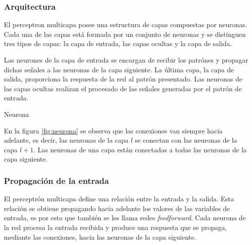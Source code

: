 \subsubsection{Arquitectura}
El perceptron multicapa posee una estructura de capas compuestas por neuronas. Cada una de las capas está formada por un conjunto de neuronas y se distinguen tres tipos de capas: la capa de entrada, las capas ocultas y la capa de salida.

Las neurones de la capa de entrada se encargan de recibir los patrónes y propagar dichas señales a las neuronas de la capa siguiente. La última capa, la capa de salida, proporciona la respuesta de la red al patrón presentado. Las neuronas de las capas ocultas realizan el procesado de las señales generadas por el patrón de entrada.
\begin{imagen}
	\scalebox{0.8}{}
	\caption{Neurona}
	\label{fig:neurona}
\end{imagen}

En la figura \ref{fig:neurona} se observa que las conexiones van siempre hacia adelante, es decir, las neuronas de la capa $l$ se conectan con las neuronas de la capa $l + 1$. Las neuronas de una capa están conectadas a todas las neuronas de la capa siguiente.

\subsubsection{Propagación de la entrada}
El perceptrón multicapa define una relación entre la entrada y la salida. Esta relación se obtiene propagando hacia adelante los valores de las variables de entrada, es por esto que también se les llama redes {\em feedforward}. Cada neurona de la red procesa la entrada recibida y produce una respuesta que se propaga, mediante las conexiones, hacia las neuronas de la capa siguiente.

